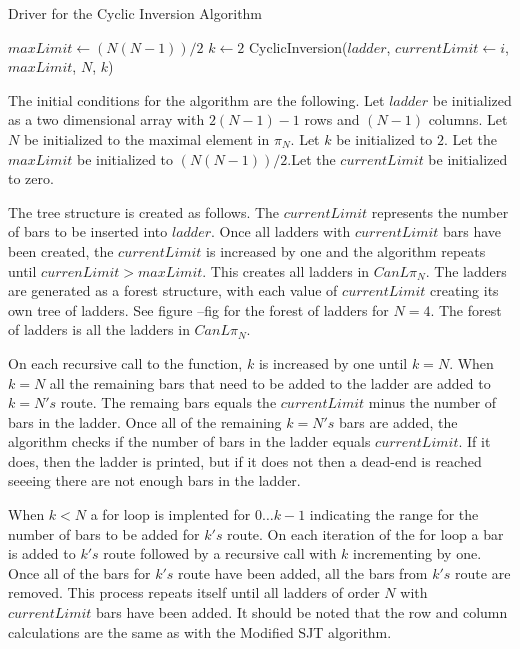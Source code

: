 \begin{algorithm}
  \caption{Driver for the Cyclic Inversion Algorithm}
  \begin{algorithmic}[1]
      \State $maxLimit \gets (N(N-1))/2$
      \State $k \gets 2$
        \State CyclicInversion($ladder$, $currentLimit \gets i$, $maxLimit$, $N$, $k$)

      \EndFor

    \EndFunction
  \end{algorithmic}
\end{algorithm}\pagebreak

The initial conditions for the algorithm are the following. Let $ladder$ be initialized as a two dimensional array with $2(N-1)-1$ rows and $(N-1)$ columns.  Let $N$ be initialized to the maximal element in $\pi_{N}$. 
Let $k$ be initialized to $2$.
Let the $maxLimit$ be initialized to $(N(N-1))/2$.Let the $currentLimit$ be initialized to zero. 

The tree structure is created as follows. The $currentLimit$ 
represents the number of bars to be inserted into $ladder$. Once all ladders with $currentLimit$ bars have been created, the $currentLimit$ is increased by one 
and the algorithm repeats until $currenLimit > maxLimit$. This creates all ladders in $CanL{\pi_{N}}$. The ladders are generated as a forest structure,
 with each value of $currentLimit$ creating its own tree of ladders. See figure --fig for the 
forest of ladders for $N=4$. The forest of ladders is all the ladders in $CanL{\pi_{N}}$. 

On each recursive call to the function, $k$ is increased by one until $k=N$. When $k=N$ all the remaining bars that need to 
be added to the ladder are added to $k=N's$ route. The remaing bars equals the $currentLimit$ minus the number of bars in the ladder.
Once all of the remaining $k=N's$ bars are added, the algorithm 
checks if the number of bars in the ladder equals $currentLimit$. If it does, then the ladder is printed, but if it 
does not then a dead-end is reached seeeing there are not enough bars in the ladder.\par 
When $k < N$ a for loop is implented for $0 \dots k-1$ indicating the range for the number of bars 
to be added for $k's$ route. On each iteration of the for loop a bar is added to $k's$ route followed by a 
recursive call with $k$ incrementing by one. Once all of the bars for $k's$ route have been added, all 
the bars from $k's$ route are removed. This process repeats itself until all ladders of order $N$ with 
$currentLimit$ bars have been added. It should be noted that the row and column calculations are the same as with the Modified SJT algorithm. 


